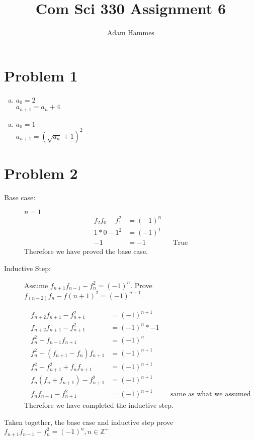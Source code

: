 \documentclass[11pt]{article}
\begin{document}
\title{Com Sci 330 Assignment 6}
\author{Adam Hammes}
\maketitle

\section*{Problem 1}
	\begin{enumerate}[(a)]
		\item $a_0 = 2$\\
			  $a_{n+1} = a_n + 4$
	\end{enumerate}
	\begin{enumerate}[(d)]
		\item $a_0 = 1$ \\
			  $a_{n+1} = (\sqrt{a_n} + 1)^2$
	\end{enumerate}

\section*{Problem 2}
	\begin{description}

	\item[Base case:] $n =1$
	\begin{align*}
		f_{2}f_0 - f_1^2 &= (-1)^n\\
		1*0 -1^2 &= (-1)^1 \\
		-1 &= -1 && \text{True}
	\end{align*}
	Therefore we have proved the base case.
	
	\item[Inductive Step:] Assume $f_{n+1}f_{n-1}-f_n^2 = (-1)^n$. Prove $f_(n+2)f_n -f(n+1)^2 = (-1)^{n+1}$.
	
	\begin{align*}
		f_{n+2}f_{n+1}-f_{n+1}^2 &= (-1)^{n+1} \\
		f_{n+2}f_{n+1}-f_{n+1}^2 &= (-1)^n*-1 \\
		f_n^2 -f_{n-1}f_{n+1} &= (-1)^n\\
		f_n^2-(f_{n+1}-f_n)f_{n+1} &= (-1)^{n+1}\\
		f_n^2-f_{n+1}^2 + f_nf_{n+1} &= (-1)^{n+1}\\
		f_n(f_n+f_{n+1})-f_{n+1}^2 &= (-1)^{n+1}\\
		f_nf_{n+1}-f_{n+1}^2 &= (-1)^{n+1} && \text{same as what we assumed}
	\end{align*}
	Therefore we have completed the inductive step.
	\end{description}	
	Taken together, the base case and inductive step prove $f_{n+1}f_{n-1} - f_n^2 = (-1)^n, n \in \mathbb{Z}^+$
	
\end{document}
